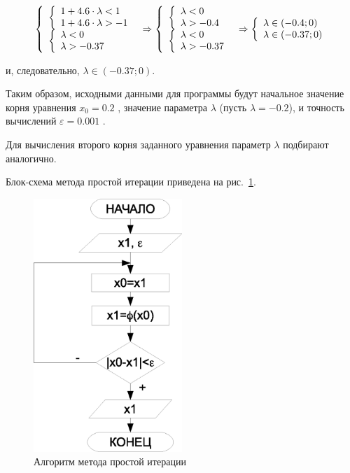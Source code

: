 $$
\left\{\begin{array}{l}
\left\{\begin{array}{l}
1+4.6\cdot \lambda<1 \cr
1+4.6\cdot \lambda>-1
\end{array}\right.\cr
\left\{\begin{array}{l}
\lambda<0 \cr
\lambda>-0.37
\end{array}\right.
\end{array}\right.
\Rightarrow
\left\{\begin{array}{l}
\left\{\begin{array}{l}
\lambda<0 \cr
\lambda>-0.4
\end{array}\right.\cr
\left\{\begin{array}{l}
\lambda<0 \cr
\lambda>-0.37
\end{array}\right.
\end{array}\right.
\Rightarrow
\left\{\begin{array}{l}
\lambda\in (-0.4;0) \cr
\lambda\in (-0.37;0)
\end{array}\right.
$$

и, следовательно, 
$\lambda\in (-0.37;0)$.

Таким образом, исходными данными для программы будут начальное значение корня уравнения  $x_0=0.2$ , значение
параметра  $\lambda$ (пусть  $\lambda=-0.2$), и точность вычислений  $\varepsilon=0.001$ .

Для вычисления второго корня заданного уравнения параметр  $\lambda$  подбирают аналогично.

Блок-схема метода простой итерации приведена на рис.~\ref{ch04:refDrawing8}.
\begin{figure}[htb]
\begin{center}
\includegraphics[width=0.5\textwidth]{img/ris_4_9}
\caption{Алгоритм метода простой итерации}
\label{ch04:refDrawing8}
\end{center}
\end{figure}

